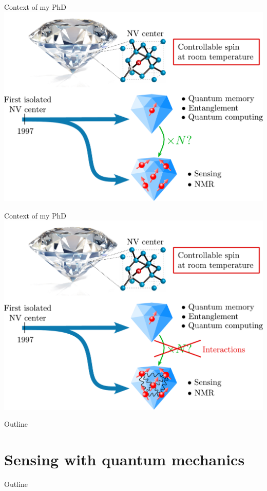 \documentclass{beamer}
\begin{document}
\begin{frame}{Context of my PhD}
\centering
\includegraphics[width=\textwidth,height=0.85\textheight,keepaspectratio]{Slide_contexte_f-1}
\end{frame}

\begin{frame}{Context of my PhD}
\centering
\includegraphics[width=\textwidth,height=0.85\textheight,keepaspectratio]{Slide_contexte_f}
\end{frame}

\begin{frame}{Outline}
\tableofcontents
\end{frame}

\section{Sensing with quantum mechanics}
\begin{frame}{Outline}
\tableofcontents[currentsection]
\end{frame}
\end{document}
